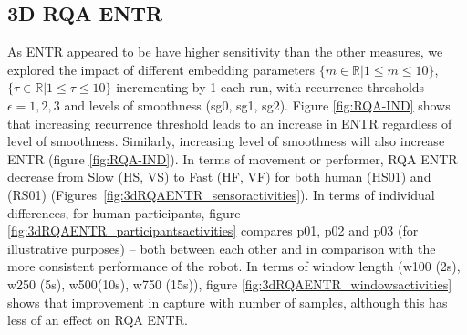 \documentclass[fleqn,10pt]{wlscirep}
\begin{document}
\subsection*{3D RQA ENTR}
As ENTR appeared to be have higher sensitivity than the other measures, 
we explored the impact of different embedding parameters 
$ \{ m \in \mathbb{R} | 1 \le m \le 10  \} $,
$  \{ \tau \in \mathbb{R} | 1 \le \tau \le 10  \} $ 
incrementing by 1 each run, with recurrence thresholds $\epsilon=1, 2, 3$ 
and levels of smoothness (sg0, sg1, sg2).  
Figure \ref{fig:RQA-IND} shows that increasing recurrence 
threshold leads to an increase in ENTR regardless of level of smoothness.  
Similarly, increasing level of smoothness will also increase ENTR (figure \ref{fig:RQA-IND}).
In terms of movement or performer, RQA ENTR decrease from Slow (HS, VS) to Fast (HF, VF) 
for both human (HS01) and (RS01) (Figures~\ref{fig:3dRQAENTR_sensoractivities}).
In terms of individual differences, for human participants, 
figure \ref{fig:3dRQAENTR_participantsactivities} compares p01, p02 and p03 (for illustrative purposes) --
both between each other and in comparison with the more consistent performance of the robot.  
In terms of window length (w100 (2s), w250 (5s), w500(10s), w750 (15s)), 
figure \ref{fig:3dRQAENTR_windowsactivities} shows that improvement in 
capture with number of samples, although this has less of an effect on RQA ENTR.
\end{document}
